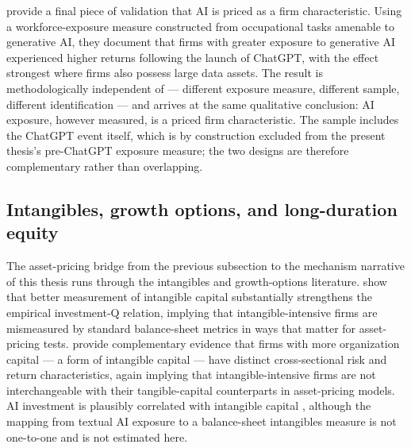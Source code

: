  provide a final piece of
validation that AI is priced as a firm characteristic. Using a
workforce-exposure measure constructed from occupational tasks
amenable to generative AI, they document that firms with greater
exposure to generative AI experienced higher returns following the
launch of ChatGPT, with the effect strongest where firms also possess
large data assets. The result is methodologically independent of
\citet{anteSaggu2025} --- different exposure measure, different sample,
different identification --- and arrives at the same qualitative
conclusion: AI exposure, however measured, is a priced firm
characteristic. The \citet{eisfeldtSchubertZhangTaska2023} sample
includes the ChatGPT event itself, which is by construction excluded
from the present thesis's pre-ChatGPT exposure measure; the two
designs are therefore complementary rather than overlapping.

\subsection*{Intangibles, growth options, and long-duration equity}

The asset-pricing bridge from the previous subsection to the
mechanism narrative of this thesis runs through the intangibles and
growth-options literature.  show that
better measurement of intangible capital substantially strengthens
the empirical investment-Q relation, implying that intangible-intensive
firms are mismeasured by standard balance-sheet metrics in ways that
matter for asset-pricing tests. 
provide complementary evidence that firms with more organization
capital --- a form of intangible capital --- have distinct
cross-sectional risk and return characteristics, again implying
that intangible-intensive firms are not interchangeable with
their tangible-capital counterparts in asset-pricing models. AI
investment is plausibly correlated with intangible capital
\citep{petersTaylor2017,eisfeldtPapanikolaou2013}, although the
mapping from textual AI exposure to a balance-sheet intangibles
measure is not one-to-one and is not estimated here.

